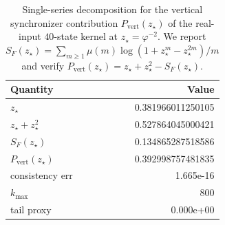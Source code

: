 \begin{table}[H]
\centering
\scriptsize
\setlength{\tabcolsep}{6pt}
\caption{Single-series decomposition for the vertical synchronizer contribution $P_{\mathrm{vert}}(z_\star)$ of the real-input $40$-state kernel at $z_\star=\varphi^{-2}$. We report $S_F(z_\star)=\sum_{m\ge 1}\mu(m)\log(1+z_\star^m-z_\star^{2m})/m$ and verify $P_{\mathrm{vert}}(z_\star)=z_\star+z_\star^2-S_F(z_\star)$.}
\label{tab:real_input_40_vert_single_series}
\begin{tabular}{l r}
\toprule
Quantity & Value\\
\midrule
$z_\star$ & 0.381966011250105\\
$z_\star+z_\star^2$ & 0.527864045000421\\
$S_F(z_\star)$ & 0.134865287518586\\
$P_{\mathrm{vert}}(z_\star)$ & 0.392998757481835\\
consistency err & 1.665e-16\\
$k_{\max}$ & 800\\
tail proxy & 0.000e+00\\
\bottomrule
\end{tabular}
\end{table}
